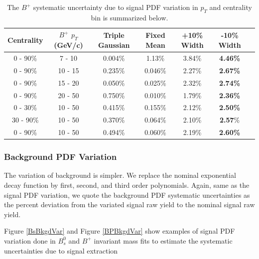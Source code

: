 \begin{table}[h]
\begin{center}
\caption{The $B^+$ systematic uncertainty due to signal PDF variation in $p_T$ and centrality bin is summarized below.}
\vspace{1em}
\label{BsPTShape}
  \begin{tabular}{| c | c |c | c| c| c| c| }
    \hline
     Centrality & $B^+$ $p_T$ (GeV/c) & Triple Gaussian &  Fixed Mean & +10\% Width & -10\% Width  \\
    \hline
    \hline
0 - 90\% & 7 - 10 &   0.004\%  &  1.13\% & 3.84\% & \textbf{4.46\%} \\ 
0 - 90\% & 10 - 15 & 0.235\%  & 0.046\%  & 2.27\% &   \textbf{2.67\%}  \\ 
0 - 90\% & 15 - 20 &  0.050\%  & 0.025\%   &  2.32\% & \textbf{2.74\%} \\ 
0 - 90\% & 20 - 50 &  0.750\%  & 0.010\%  &  1.79\%  &   \textbf{2.36\%}\\ 
0 - 30\% & 10 - 50  & 0.415\%  & 0.155\%  &2.12\% &  \textbf{2.50\%} \\ 
30 - 90\% & 10 - 50 &  0.370\% &   0.064\%  & 2.10\% &  \textbf{2.57}\%\\ 
0 - 90\% & 10 - 50 &  0.494\%   & 0.060\%  & 2.19\% &   \textbf{2.60\%} \\ 
    \hline
    \hline
\end{tabular}
\end{center}
\end{table}


\subsubsection{Background PDF Variation}

The variation of background is simpler. We replace the nominal exponential decay function by first, second, and third order polynomials. Again, same as the signal PDF variation, we quote the background PDF systematic uncertainties as the percent deviation from the variated signal raw yield to the nominal signal raw yield. 


Figure \ref{BsBkgdVar} and Figure \ref{BPBkgdVar} show examples of signal PDF variation done in $B^0_s$ and $B^+$ invariant mass fits to estimate the systematic uncertainties due to signal extraction


